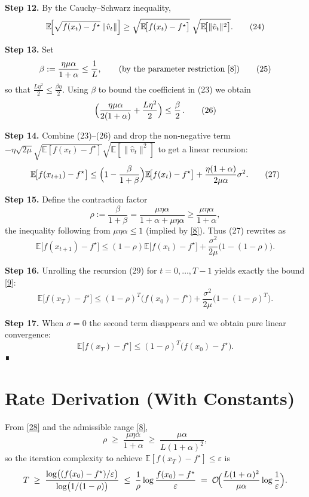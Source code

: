 \documentclass{article}
\newcommand{\EE}{\mathbb{E}}
\begin{document}
\noindent\textbf{Step 12.}  By the Cauchy–Schwarz inequality,
\[
\EE\!\Bigl[\sqrt{f(x_t)-f^\star}\,\|\hat v_t\|\Bigr]
\ge 
\sqrt{\EE\!\bigl[f(x_t)-f^\star\bigr]}\;
\sqrt{\EE\!\bigl[\|\hat v_t\|^2\bigr]} .
\tag{24}
\]

\noindent\textbf{Step 13.}  Set 
\[
\beta:=\frac{\eta\mu\alpha}{1+\alpha}\le\frac{1}{L},
\qquad\text{(by the parameter restriction \eqref{8})}
\tag{25}
\]
so that $\frac{L\eta^2}{2}\le\frac{\beta\eta}{2}$.  
Using $\beta$ to bound the coefficient in (23) we obtain
\[
\Bigl(\frac{\eta\mu\alpha}{2(1+\alpha)}+\frac{L\eta^2}{2}\Bigr)
\le\frac{\beta}{2}\, .
\tag{26}
\]

\noindent\textbf{Step 14.}  Combine (23)–(26) and drop the non‑negative term $-\eta\sqrt{2\mu}\sqrt{\EE[f(x_t)-f^\star]}\sqrt{\EE[\|\hat v_t\|^2]}$ to get a linear recursion:
\[
\EE\!\bigl[f(x_{t+1})-f^\star\bigr]
\le\Bigl(1-\frac{\beta}{1+\beta}\Bigr)\EE\!\bigl[f(x_t)-f^\star\bigr]
+\frac{\eta(1+\alpha)}{2\mu\alpha}\sigma^2 .
\tag{27}
\]

\noindent\textbf{Step 15.}  Define the contraction factor
\[
\rho:=\frac{\beta}{1+\beta}
= \frac{\mu\eta\alpha}{1+\alpha+\mu\eta\alpha}
\ge\frac{\mu\eta\alpha}{1+\alpha},
\tag{28}
\]
the inequality following from $\mu\eta\alpha\le1$ (implied by \eqref{8}).  
Thus (27) rewrites as
\[
\EE\!\bigl[f(x_{t+1})-f^\star\bigr]
\le (1-\rho)\EE\!\bigl[f(x_t)-f^\star\bigr]
+\frac{\sigma^2}{2\mu}\bigl(1-(1-\rho)\bigr) .
\tag{29}
\]

\noindent\textbf{Step 16.}  Unrolling the recursion (29) for $t=0,\dots,T-1$ yields exactly the bound \eqref{9}:
\[
\EE\!\bigl[f(x_T)-f^\star\bigr]
\le (1-\rho)^T\bigl(f(x_0)-f^\star\bigr)
+\frac{\sigma^2}{2\mu}\bigl(1-(1-\rho)^T\bigr) .
\tag{30}
\]

\noindent\textbf{Step 17.}  When $\sigma=0$ the second term disappears and we obtain pure linear convergence:
\[
\EE\!\bigl[f(x_T)-f^\star\bigr]\le(1-\rho)^T\bigl(f(x_0)-f^\star\bigr).
\tag{31}
\]
∎

\section*{Rate Derivation (With Constants)}
From \eqref{28} and the admissible range \eqref{8},
\[
\rho\;\ge\;\frac{\mu\eta\alpha}{1+\alpha}
\;\ge\;\frac{\mu\alpha}{L(1+\alpha)^2},
\]
so the iteration complexity to achieve $\EE[f(x_T)-f^\star]\le\varepsilon$ is
\[
T\;\ge\;\frac{\log\bigl((f(x_0)-f^\star)/\varepsilon\bigr)}{\log\bigl(1/(1-\rho)\bigr)}
\;\le\;
\frac{1}{\rho}\log\frac{f(x_0)-f^\star}{\varepsilon}
\;=\;
\mathcal{O}\!\Bigl(\frac{L(1+\alpha)^2}{\mu\alpha}\log\frac{1}{\varepsilon}\Bigr).
\]
\end{document}
